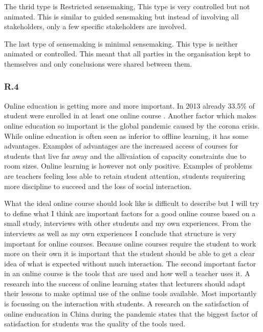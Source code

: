\documentclass[]{article}
\begin{document}
The thrid type is Restricted sensemaking, 
This type is very controlled but not animated. 
This is similar to guided sensmaking but instead of involving all stakeholders, 
only a few specific stakeholders are involved.

The last type of sensemaking is minimal sensemaking.
This type is neither animated or controlled. This meant that all parties 
in the organisation kept to themselves and only conclusions were shared between them.


\subsubsection*{R.4}
Online education is getting more and more important. In 2013 already 33.5\% of 
student were enrolled in at least one online course \cite{allen2014grade}. Another 
factor which makes online education so important is the global pandemic caused by 
the corona crisis. While online education is often seen as inferior to offline learning,
it has some advantages. Examples of advantages are the increased access of courses 
for students that live far away and the allivaiation of capacity constraints due to 
room sizes\cite{volery2000critical}. Online learning is however not only positive.
Examples of problems are teachers feeling less able to retain student attention,
students requirering more discipline to succeed and the loss of social interaction\cite{allen2014grade}.

What the ideal online course should look like is difficult to describe but I will 
try to define what I think are important factors for a good online course based on 
a small study, interviews with other students and my own experiences. 
From the interviews as well as my own experiences I conclude that structure is very 
important for online courses. Because online courses require the student to work 
more on their own it is important that the student should be able to get a clear 
idea of what is expected without much interaction. The second important factor in an 
online course is the tools that are used and how well a teacher uses it. A research 
into the success of online learning\cite{volery2000critical} states that lecturers should
adapt their lessons to make optimal use of the online tools available. Most importantly 
is focussing on the interaction with students. A research on the satisfaction of 
online enducation in China during the pandemic\cite{chen2020analysis} states that 
the biggest factor of satisfaction for students was the quality of the tools used.
\end{document}

